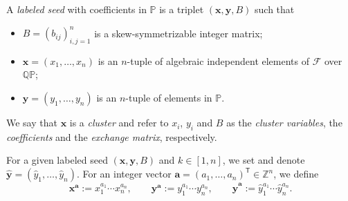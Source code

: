 \documentclass[pdftex]{sigma}
\newcommand{\Z}{\mathbb{Z}}
\numberwithin{equation}{section}
\begin{document}
\begin{Definition}\label{D4}
 A {\it labeled seed} with coefficients in $\mathbb{P}$ is a triplet $(\mathbf{x},\mathbf{y},B)$ such that
 \begin{itemize}\itemsep=0pt
 \item $B=(b_{ij})_{i,j=1}^{n}$ is a skew-symmetrizable integer matrix;
 \item $\mathbf{x}=(x_1,\dots,x_n)$ is an $n$-tuple of algebraic independent elements of $\mathcal{F}$ over $\mathbb{QP}$;
 \item $\mathbf{y}=(y_1,\dots,y_n)$ is an $n$-tuple of elements in $\mathbb{P}$.

 \end{itemize}
We say that $\mathbf{x}$ is a {\it cluster} and refer to $x_i$, $y_i$ and $B$ as the {\it cluster variables}, the {\it coefficients}
and the {\it exchange matrix}, respectively.
\end{Definition}
For a given labeled seed $(\mathbf{x},\mathbf{y},B)$ and $k\in [1,n]$, we set
and denote ${\hat{\mathbf{y}}=(\hat{y}_1,\dots, \hat{y}_n)}$. For an integer vector $\mathbf{a}=(a_1,\dots, a_n)^{\mathsf T}\in \Z^n$, we define
\[
\mathbf{x}^\mathbf{a}:=x_1^{a_1}\cdots x_n^{a_n},\qquad \mathbf{y}^\mathbf{a}:=y_1^{a_1}\cdots y_n^{a_n},\qquad \hat{\mathbf{y}}^\mathbf{a}:=\hat{y}_1^{a_1}\cdots \hat{y}_n^{a_n}.
\]
\end{document}
